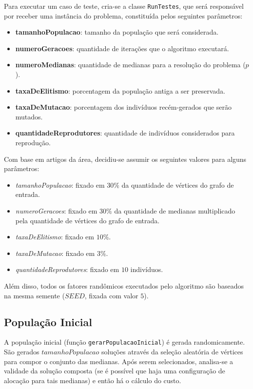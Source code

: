 	Para executar um caso de teste, cria-se a classe \verb|RunTestes|, que será responsável por receber uma instância do problema, constituída pelos seguintes parâmetros:
	\begin{itemize}
		\item \textbf{tamanhoPopulacao}: tamanho da população que será considerada.
		\item \textbf{numeroGeracoes}: quantidade de iterações que o algoritmo executará.
		\item \textbf{numeroMedianas}: quantidade de medianas para a resolução do problema ($p$).
		\item \textbf{taxaDeElitismo}: porcentagem da população antiga a ser preservada.
		\item \textbf{taxaDeMutacao}: porcentagem dos indivíduos recém-gerados que serão mutados.
		\item \textbf{quantidadeReprodutores}: quantidade de indivíduos considerados para reprodução.
	\end{itemize}

	Com base em artigos da área, decidiu-se assumir os seguintes valores para alguns parâmetros:
	\begin{itemize}
		\item \textit{tamanhoPopulacao}: fixado em $30\%$ da quantidade de vértices do grafo de entrada.
		\item \textit{numeroGeracoes}: fixado em $30\%$ da quantidade de medianas multiplicado pela quantidade de vértices do grafo de entrada.
		\item \textit{taxaDeElitismo}: fixado em $10\%$.
		\item \textit{taxaDeMutacao}: fixado em $3\%$.
		\item \textit{quantidadeReprodutores}: fixado em $10$ indivíduos.
	\end{itemize}

	Além disso, todos os fatores randômicos executados pelo algoritmo são baseados na mesma semente ($SEED$, fixada com valor $5$).

	\subsection{População Inicial}
	A população inicial (função \verb|gerarPopulacaoInicial|) é gerada randomicamente. São gerados $tamanhoPopulacao$ soluções através da seleção aleatória de vértices para compor o conjunto das medianas. Após serem selecionados, analisa-se a validade da solução composta (se é possível que haja uma configuração de alocação para tais medianas) e então há o cálculo do custo.

